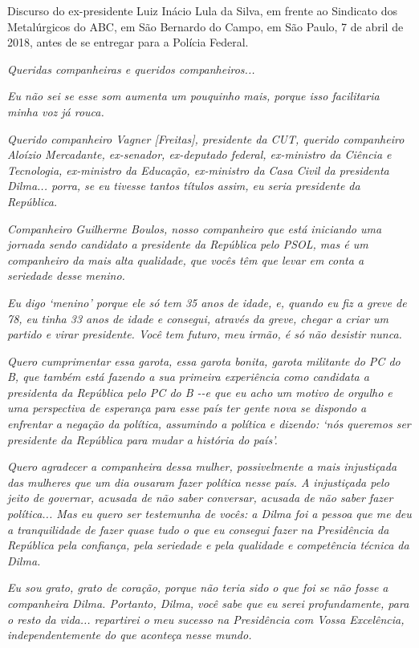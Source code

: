 Discurso do ex-presidente Luiz Inácio Lula da Silva, em frente ao
Sindicato dos Metalúrgicos do ABC, em São Bernardo do Campo, em São
Paulo, 7 de abril de 2018, antes de se entregar para a Polícia Federal.

\emph{Queridas companheiras e queridos companheiros...}

\emph{Eu não sei se esse som aumenta um pouquinho mais, porque isso
facilitaria minha voz já rouca.~}

\emph{Querido companheiro Vagner {[}Freitas{]}, presidente da CUT,
querido companheiro Aloízio Mercadante, ex-senador, ex-deputado federal,
ex-ministro da Ciência e Tecnologia, ex-ministro da Educação,
ex-ministro da Casa Civil da presidenta Dilma... porra, se eu tivesse
tantos títulos assim, eu seria presidente da República.~}

\emph{Companheiro Guilherme Boulos, nosso companheiro que está iniciando
uma jornada sendo candidato a presidente da República pelo PSOL, mas é
um companheiro da mais alta qualidade, que vocês têm que levar em conta
a seriedade desse menino.~}

\emph{Eu digo `menino' porque ele só tem 35 anos de idade, e, quando eu
fiz a greve de 78, eu tinha 33 anos de idade e consegui, através da
greve, chegar a criar um partido e virar presidente. Você tem futuro,
meu irmão, é só não desistir nunca.}

\emph{Quero cumprimentar essa garota, essa garota bonita, garota
militante do PC do B, que também está fazendo a sua primeira experiência
como candidata a presidenta da República pelo PC do B -\/-e que eu acho
um motivo de orgulho e uma perspectiva de esperança para esse país ter
gente nova se dispondo a enfrentar a negação da política, assumindo a
política e dizendo: `nós queremos ser presidente da República para mudar
a história do país'.}

\emph{Quero agradecer a companheira dessa mulher, possivelmente a mais
injustiçada das mulheres que um dia ousaram fazer política nesse país. A
injustiçada pelo jeito de governar, acusada de não saber conversar,
acusada de não saber fazer política... Mas eu quero ser testemunha de
vocês: a Dilma foi a pessoa que me deu a tranquilidade de fazer quase
tudo o que eu consegui fazer na Presidência da República pela confiança,
pela seriedade e pela qualidade e competência técnica da Dilma.~}

\emph{Eu sou grato, grato de coração, porque não teria sido o que foi se
não fosse a companheira Dilma. Portanto, Dilma, você sabe que eu serei
profundamente, para o resto da vida... repartirei o meu sucesso na
Presidência com Vossa Excelência, independentemente do que aconteça
nesse mundo.}

